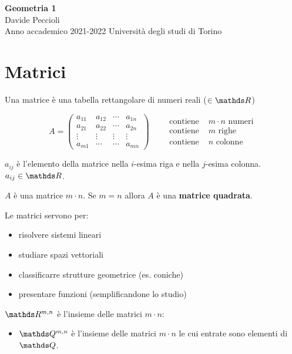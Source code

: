 \documentclass[twoside, 11pt, titlepage]{article}
\begin{document}
\begin{titlepage}
\null
\vfill
\begin{center}
{\Huge \textbf{Geometria 1}}\\
\vspace{1em}
{\large Davide Peccioli}\\
\vspace{0.6em}
{\large Anno accademico 2021-2022}
\vfill
Università degli studi di Torino
\end{center}
\end{titlepage}
{\pagestyle{empty}
\null\newpage}

\section{Matrici}

Una matrice è una tabella rettangolare di numeri reali ($\in\R$)

\[
A=\begin{pmatrix}
a_{1 1} & a_{1 2} & \cdots & a_{1 n} \\
a_{2 1} & a_{2 2} & \cdots & a_{2 n}\\
\vdots & \vdots & \vdots & \vdots \\
a_{m 1} & \cdots & \cdots & a_{m n}
\end{pmatrix}\qquad \begin{aligned}
\text{contiene } &m\cdot n \text{ numeri}\\
\text{contiene } &m \text{ righe}\\
\text{contiene } &n \text{ colonne}
\end{aligned}
\]

$a_{ij}$ è l'elemento della matrice nella $i$-esima riga e nella $j$-esima colonna. $a_{ij}\in\R$.

$A$ è una matrice $m\cdot n$. Se $m=n$ allora $A$ è una \textbf{matrice quadrata}.

Le matrici servono per:
\begin{itemize}
\item risolvere sistemi lineari
\item studiare spazi vettoriali
\item classificarre strutture geometrice (es. coniche)
\item presentare funzioni (semplificandone lo studio)
\end{itemize}

$\R^{m,n}$ è l'insieme delle matrici $m\cdot n$:
\begin{itemize}
\item $\Q^{m, n}$ è l'insieme delle matrici $m\cdot n$ le cui entrate sono elementi di $\Q$.
\end{itemize}
\end{document}
